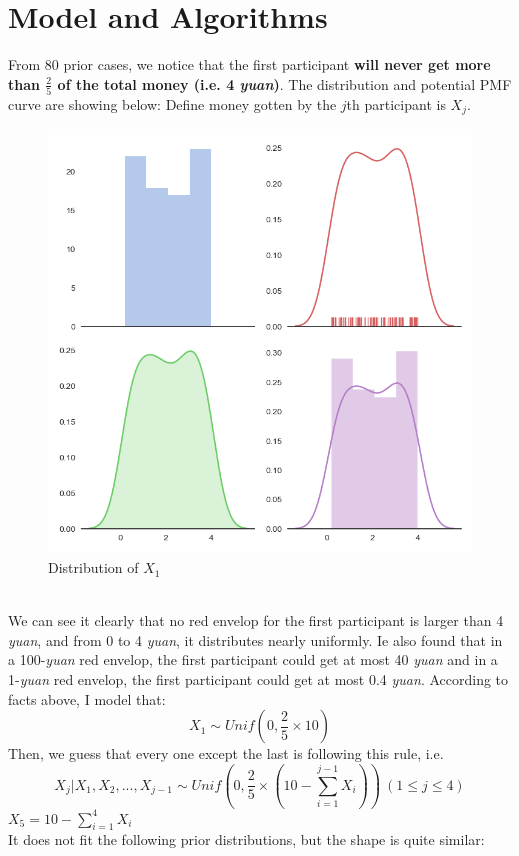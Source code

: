 \documentclass[10pt,journal]{IEEEtran}
\begin{document}
\section{Model and Algorithms}
	From 80 prior cases, we notice that the first participant \textbf{will never get more than \(\frac{2}{5}\) of the total money (i.e. 4 \emph{yuan})}. The distribution and potential PMF curve are showing below:	
	Define money gotten by the \(j\)th participant is \(X_j\).
	\\
\begin{figure}[!ht]
	\centering
	\includegraphics[width=0.7\columnwidth,height=0.6\linewidth]{10_1.png}
	\caption{Distribution of \(X_1\)}
\end{figure}
\\
We can see it clearly that no red envelop for the first participant is larger than 4 \emph{yuan}, and from 0 to 4 \emph{yuan}, it distributes nearly uniformly. Ie also found that in a 100-\emph{yuan} red envelop, the first participant could get at most 40 \emph{yuan} and in a 1-\emph{yuan} red envelop, the first participant could get at most 0.4 \emph{yuan}. According to facts above, I model that:
\begin{displaymath}
	X_1\sim Unif(0,\frac{2}{5}\times10)
\end{displaymath}
Then, we guess that every one except the last is following this rule, i.e.
\begin{displaymath}
X_j|X_1,X_2,...,X_{j-1}\sim Unif(0,\frac{2}{5}\times(10-\sum_{i=1}^{j-1}X_i))\ (1\leq j\leq 4)
\end{displaymath}
\(X_5=10-\sum_{i=1}^{4}X_i\)
\\
It does not fit the following prior distributions, but the shape is quite similar:
\end{document}
